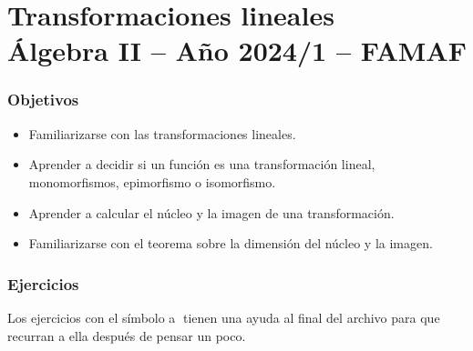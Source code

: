 \chapter{Transformaciones lineales \\ Álgebra  II -- Año 2024/1 -- FAMAF}\label{practico-7}


\subsection*{Objetivos}

\begin{itemize}
 \item Familiarizarse con las transformaciones lineales.
 \item Aprender a decidir si un función es una transformación lineal, monomorfismos, epimorfismo o isomorfismo.
 \item Aprender a calcular el núcleo y la imagen de una transformación.
 \item Familiarizarse con el teorema sobre la dimensión del núcleo y la imagen.
\end{itemize}



\subsection*{Ejercicios} Los ejercicios con el símbolo \textcircled{a} tienen una ayuda al final del archivo para que recurran a ella después de pensar un poco.

